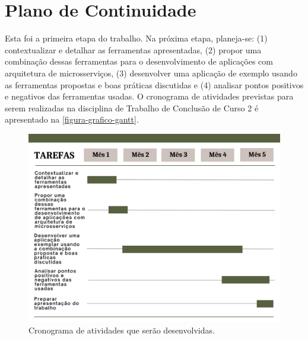 \chapter{Plano de Continuidade}

Esta foi a primeira etapa do trabalho. Na próxima etapa, planeja-se: (1) contextualizar e detalhar as ferramentas apresentadas, (2) propor uma combinação dessas ferramentas para o desenvolvimento de aplicações com arquitetura de microsserviços, (3) desenvolver uma aplicação de exemplo usando as ferramentas propostas e boas práticas discutidas e (4) analisar pontos positivos e negativos das ferramentas usadas. O cronograma de atividades previstas para serem realizadas na disciplina de Trabalho de Conclusão de Curso 2 é apresentado na \autoref{figura-grafico-gantt}.

\begin{figure}[htb]
	\caption{\label{figura-grafico-gantt}Cronograma de atividades que serão desenvolvidas.}
	\begin{center}
	    \includegraphics[scale=0.5]{Imagens/grafico-gantt.pdf}
	\end{center}
\end{figure}